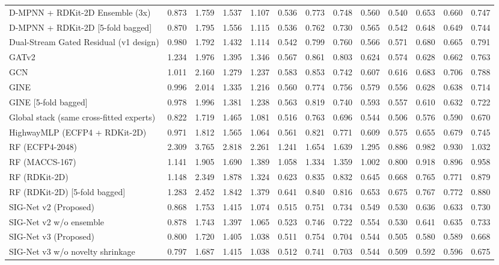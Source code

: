 \documentclass[11pt]{article}
\begin{document}
\begin{landscape}
{\begin{longtable}{lcccccccccccc}
D-MPNN + RDKit-2D Ensemble (3x) & 0.873 & 1.759 & 1.537 & 1.107 & 0.536 & 0.773 & 0.748 & 0.560 & 0.540 & 0.653 & 0.660 & 0.747 \\
D-MPNN + RDKit-2D [5-fold bagged] & 0.870 & 1.795 & 1.556 & 1.115 & 0.536 & 0.762 & 0.730 & 0.565 & 0.542 & 0.648 & 0.649 & 0.744 \\
Dual-Stream Gated Residual (v1 design) & 0.980 & 1.792 & 1.432 & 1.114 & 0.542 & 0.799 & 0.760 & 0.566 & 0.571 & 0.680 & 0.665 & 0.791 \\
GATv2 & 1.234 & 1.976 & 1.395 & 1.346 & 0.567 & 0.861 & 0.803 & 0.624 & 0.574 & 0.628 & 0.662 & 0.763 \\
GCN & 1.011 & 2.160 & 1.279 & 1.237 & 0.583 & 0.853 & 0.742 & 0.607 & 0.616 & 0.683 & 0.706 & 0.788 \\
GINE & 0.996 & 2.014 & 1.335 & 1.216 & 0.560 & 0.774 & 0.756 & 0.579 & 0.556 & 0.628 & 0.638 & 0.714 \\
GINE [5-fold bagged] & 0.978 & 1.996 & 1.381 & 1.238 & 0.563 & 0.819 & 0.740 & 0.593 & 0.557 & 0.610 & 0.632 & 0.722 \\
Global stack (same cross-fitted experts) & 0.822 & 1.719 & 1.465 & 1.081 & 0.516 & 0.763 & 0.696 & 0.544 & 0.506 & 0.576 & 0.590 & 0.670 \\
HighwayMLP (ECFP4 + RDKit-2D) & 0.971 & 1.812 & 1.565 & 1.064 & 0.561 & 0.821 & 0.771 & 0.609 & 0.575 & 0.655 & 0.679 & 0.745 \\
RF (ECFP4-2048) & 2.309 & 3.765 & 2.818 & 2.261 & 1.241 & 1.654 & 1.639 & 1.295 & 0.886 & 0.982 & 0.930 & 1.032 \\
RF (MACCS-167) & 1.141 & 1.905 & 1.690 & 1.389 & 1.058 & 1.334 & 1.359 & 1.002 & 0.800 & 0.918 & 0.896 & 0.958 \\
RF (RDKit-2D) & 1.148 & 2.349 & 1.878 & 1.324 & 0.623 & 0.835 & 0.832 & 0.645 & 0.668 & 0.765 & 0.771 & 0.879 \\
RF (RDKit-2D) [5-fold bagged] & 1.283 & 2.452 & 1.842 & 1.379 & 0.641 & 0.840 & 0.816 & 0.653 & 0.675 & 0.767 & 0.772 & 0.880 \\
SIG-Net v2 (Proposed) & 0.868 & 1.753 & 1.415 & 1.074 & 0.515 & 0.751 & 0.734 & 0.549 & 0.530 & 0.636 & 0.633 & 0.730 \\
SIG-Net v2 w/o ensemble & 0.878 & 1.743 & 1.397 & 1.065 & 0.523 & 0.746 & 0.722 & 0.554 & 0.530 & 0.641 & 0.635 & 0.733 \\
SIG-Net v3 (Proposed) & 0.800 & 1.720 & 1.405 & 1.038 & 0.511 & 0.754 & 0.704 & 0.544 & 0.505 & 0.580 & 0.589 & 0.668 \\
SIG-Net v3 w/o novelty shrinkage & 0.797 & 1.687 & 1.415 & 1.038 & 0.512 & 0.741 & 0.703 & 0.544 & 0.509 & 0.592 & 0.596 & 0.675 \\

\end{longtable}}
\end{landscape}
\end{document}
